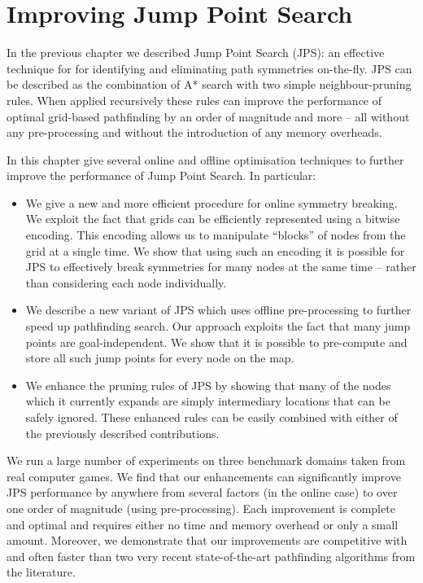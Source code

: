 \chapter{Improving Jump Point Search}
\label{cha::jps2}
In the previous chapter we described Jump Point Search (JPS): an effective
technique for for identifying and eliminating path symmetries on-the-fly.  JPS
can be described as the combination of A* search with two simple
neighbour-pruning rules. When applied recursively these rules can improve the
performance of optimal grid-based pathfinding by an order of magnitude and
more -- all without any pre-processing and without the introduction of any
memory overheads. 

In this chapter give several online and offline optimisation techniques to 
further improve the performance of Jump Point Search. In particular:
\begin{itemize}
\item We give a new and more efficient procedure for online symmetry breaking. 
We exploit the fact that grids can be efficiently represented using a bitwise
encoding. This encoding allows us to manipulate ``blocks'' of nodes from the 
grid at a single time. We show that using such an encoding it is possible
for JPS to effectively break symmetries for many nodes at the same time -- 
rather than considering each node individually.
\item We describe a new variant of JPS which uses offline pre-processing to 
further speed up pathfinding search. Our approach exploits the fact that many
jump points are goal-independent. We show that it is possible to pre-compute 
and store all such jump points for every node on the map.
\item We enhance the pruning rules of JPS by showing that many of the nodes
which it currently expands are simply intermediary locations that can be
safely ignored. These enhanced rules can be easily combined with either
of the previously described contributions.
\end{itemize}

We run a large number of experiments on three benchmark domains taken from real
computer games. We find that our  enhancements can significantly improve JPS performance by
anywhere from several factors  (in the online case) to over one order of magnitude
(using pre-processing). Each improvement is complete and optimal
and requires either no time and memory overhead or only a small amount.
Moreover, we demonstrate that our improvements are competitive with and often 
faster than two very recent state-of-the-art pathfinding algorithms from the literature.

\newpage
